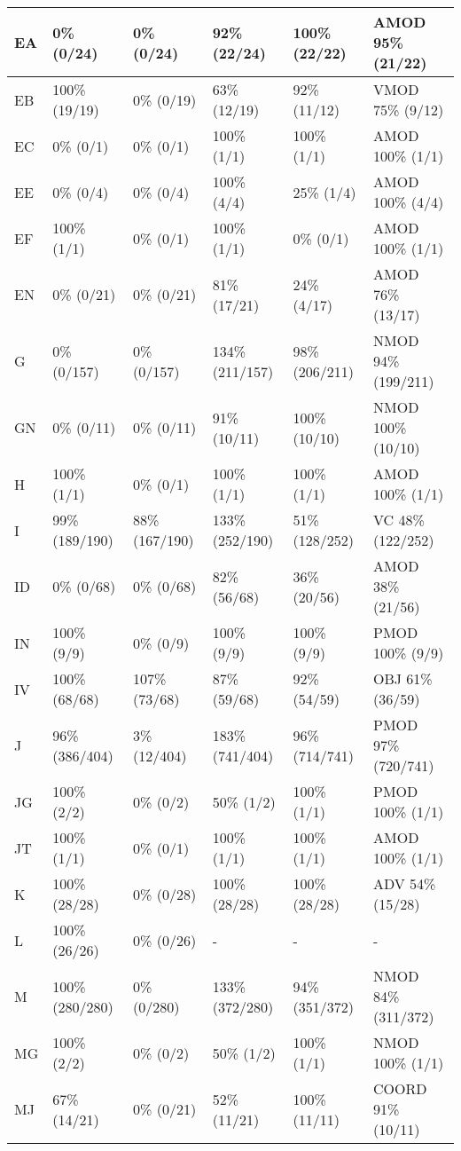\begin{figure*}
\begin{tabular}{|l|l|l|l|l|l|}
\hline
EA & 0\% (0/24) & 0\% (0/24) & 92\% (22/24) & 100\% (22/22) & AMOD 95\% (21/22) \\ 
\hline
EB & 100\% (19/19) & 0\% (0/19) & 63\% (12/19) & 92\% (11/12) & VMOD 75\% (9/12) \\ 
\hline
EC & 0\% (0/1) & 0\% (0/1) & 100\% (1/1) & 100\% (1/1) & AMOD 100\% (1/1) \\ 
\hline
EE & 0\% (0/4) & 0\% (0/4) & 100\% (4/4) & 25\% (1/4) & AMOD 100\% (4/4) \\ 
\hline
EF & 100\% (1/1) & 0\% (0/1) & 100\% (1/1) & 0\% (0/1) & AMOD 100\% (1/1) \\ 
\hline
EN & 0\% (0/21) & 0\% (0/21) & 81\% (17/21) & 24\% (4/17) & AMOD 76\% (13/17) \\ 
\hline
G & 0\% (0/157) & 0\% (0/157) & 134\% (211/157) & 98\% (206/211) & NMOD 94\% (199/211) \\ 
\hline
GN & 0\% (0/11) & 0\% (0/11) & 91\% (10/11) & 100\% (10/10) & NMOD 100\% (10/10) \\ 
\hline
H & 100\% (1/1) & 0\% (0/1) & 100\% (1/1) & 100\% (1/1) & AMOD 100\% (1/1) \\ 
\hline
I & 99\% (189/190) & 88\% (167/190) & 133\% (252/190) & 51\% (128/252) & VC 48\% (122/252) \\ 
\hline
ID & 0\% (0/68) & 0\% (0/68) & 82\% (56/68) & 36\% (20/56) & AMOD 38\% (21/56) \\ 
\hline
IN & 100\% (9/9) & 0\% (0/9) & 100\% (9/9) & 100\% (9/9) & PMOD 100\% (9/9) \\ 
\hline
IV & 100\% (68/68) & 107\% (73/68) & 87\% (59/68) & 92\% (54/59) & OBJ 61\% (36/59) \\ 
\hline
J & 96\% (386/404) & 3\% (12/404) & 183\% (741/404) & 96\% (714/741) & PMOD 97\% (720/741) \\ 
\hline
JG & 100\% (2/2) & 0\% (0/2) & 50\% (1/2) & 100\% (1/1) & PMOD 100\% (1/1) \\ 
\hline
JT & 100\% (1/1) & 0\% (0/1) & 100\% (1/1) & 100\% (1/1) & AMOD 100\% (1/1) \\ 
\hline
K & 100\% (28/28) & 0\% (0/28) & 100\% (28/28) & 100\% (28/28) & ADV 54\% (15/28) \\ 
\hline
L & 100\% (26/26) & 0\% (0/26) & - & - & - \\ 
\hline
M & 100\% (280/280) & 0\% (0/280) & 133\% (372/280) & 94\% (351/372) & NMOD 84\% (311/372) \\ 
\hline
MG & 100\% (2/2) & 0\% (0/2) & 50\% (1/2) & 100\% (1/1) & NMOD 100\% (1/1) \\ 
\hline
MJ & 67\% (14/21) & 0\% (0/21) & 52\% (11/21) & 100\% (11/11) & COORD 91\% (10/11) \\ 

\end{tabular}
\end{figure*}
